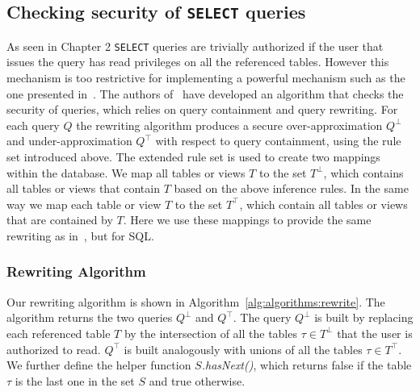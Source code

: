 \FloatBarrier
\subsection{Checking security of \texttt{SELECT} queries}

As seen in Chapter 2 \texttt{SELECT} queries are trivially authorized  if the user that issues the query has read privileges on all the referenced tables.
%
However this mechanism is too restrictive for implementing a powerful mechanism such as the one presented in~\cite{guarnieri2016strong}.
%
The authors of~\cite{guarnieri2016strong} have developed an algorithm that checks the security of queries, which relies on query containment and query rewriting. 
%
For each query $Q$ the rewriting algorithm produces a secure over-approximation $Q^\bot$ and under-approximation $Q^\top$ with respect to query containment, using the rule set introduced above. 
%
%
The extended rule set is used to create two mappings within the database.
%
We map all tables or views $T$ to the set $T^\bot$, which contains all tables or views that contain $T$ based on the above inference rules.
%
In the same way we map each table or view $T$ to the set $T^\top$, which contain all tables or views that are contained by $T$.
%
Here we use these mappings to provide the same rewriting as in~\cite{guarnieri2016strong}, but for SQL.

\subsubsection{Rewriting Algorithm}
%
Our rewriting algorithm is shown in Algorithm~\ref{alg:algorithms:rewrite}. %
%
The algorithm returns the two queries $Q^\bot$ and $Q^\top$.
%
The query $Q^\bot$ is built by replacing each referenced table $T$ by the intersection of all the tables $\tau \in T^\bot$ that the user is authorized to read.
%
$Q^\top$ is built analogously with unions of all the tables $\tau \in T^\top$.
%
We further define the helper function \emph{$S$.hasNext()}, which returns false if the table $\tau$ is the last one in the set $S$ and true otherwise. 



